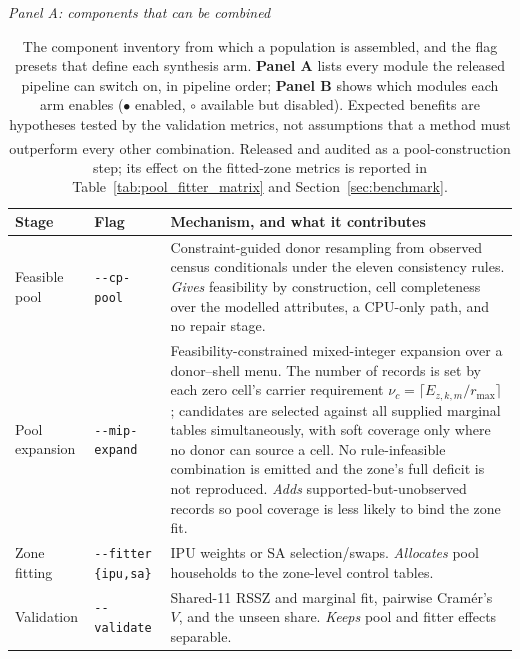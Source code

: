 \documentclass[review]{elsarticle}
\begin{document}
\begin{table}[htbp]
\centering
\caption{The component inventory from which a population is assembled, and the flag presets that define each synthesis arm. \textbf{Panel A} lists every module the released pipeline can switch on, in pipeline order; \textbf{Panel B} shows which modules each arm enables ($\bullet$ enabled, $\circ$ available but disabled). Expected benefits are hypotheses tested by the validation metrics, not assumptions that a method must outperform every other combination. \textsuperscript{\dag}Released and audited as a pool-construction step; its effect on the fitted-zone metrics is reported in Table~\ref{tab:pool_fitter_matrix} and Section~\ref{sec:benchmark}.}
\label{tab:strategy_roles}
\footnotesize
\setlength{\tabcolsep}{4pt}
\emph{Panel A: components that can be combined}\\[1pt]
\begin{tabular}{@{}>{\raggedright\arraybackslash}p{2.2cm}>{\raggedright\arraybackslash}p{2.6cm}>{\raggedright\arraybackslash}p{10.2cm}@{}}
\toprule
\textbf{Stage} & \textbf{Flag} & \textbf{Mechanism, and what it contributes} \\
\midrule
Feasible pool & \texttt{-{}-cp-pool} & Constraint-guided donor resampling from observed census conditionals under the eleven consistency rules. \emph{Gives} feasibility by construction, cell completeness over the modelled attributes, a CPU-only path, and no repair stage. \\
Pool expansion & \texttt{-{}-mip-expand} & Feasibility-constrained mixed-integer expansion over a donor--shell menu. The number of records is set by each zero cell's carrier requirement $\nu_c=\lceil E_{z,k,m}/r_{\max}\rceil$; candidates are selected against all supplied marginal tables simultaneously, with soft coverage only where no donor can source a cell. No rule-infeasible combination is emitted and the zone's full deficit is not reproduced. \emph{Adds} supported-but-unobserved records so pool coverage is less likely to bind the zone fit. \\
Zone fitting & \texttt{-{}-fitter} \texttt{\{ipu,sa\}} & IPU weights or SA selection/swaps. \emph{Allocates} pool households to the zone-level control tables. \\
Validation & \texttt{-{}-validate} & Shared-11 RSSZ and marginal fit, pairwise Cram\'{e}r's $V$, and the unseen share. \emph{Keeps} pool and fitter effects separable. \\
\bottomrule
\end{tabular}
\\[4pt]

\end{table}
\end{document}
